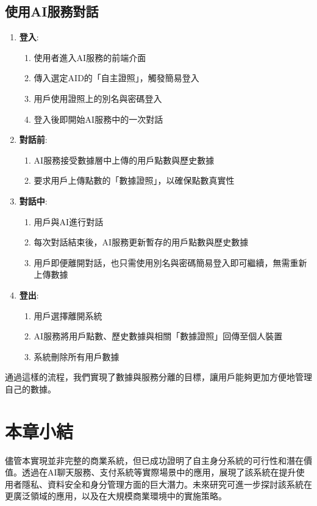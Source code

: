 \subsection{使用AI服務對話}
\begin{enumerate}
  \item \textbf{登入}:
        \begin{enumerate}
          \item 使用者進入AI服務的前端介面
          \item 傳入選定AID的「自主證照」，觸發簡易登入
          \item 用戶使用證照上的別名與密碼登入
          \item 登入後即開始AI服務中的一次對話
        \end{enumerate}
  \item \textbf{對話前}:
        \begin{enumerate}
          \item AI服務接受數據層中上傳的用戶點數與歷史數據
          \item 要求用戶上傳點數的「數據證照」，以確保點數真實性
        \end{enumerate}
  \item \textbf{對話中}:
        \begin{enumerate}
          \item 用戶與AI進行對話
          \item 每次對話結束後，AI服務更新暫存的用戶點數與歷史數據
          \item 用戶即便離開對話，也只需使用別名與密碼簡易登入即可繼續，無需重新上傳數據
        \end{enumerate}
  \item \textbf{登出}:
        \begin{enumerate}
          \item 用戶選擇離開系統
          \item AI服務將用戶點數、歷史數據與相關「數據證照」回傳至個人裝置
          \item 系統刪除所有用戶數據
        \end{enumerate}
\end{enumerate}
通過這樣的流程，我們實現了數據與服務分離的目標，讓用戶能夠更加方便地管理自己的數據。
\section{本章小結}
儘管本實現並非完整的商業系統，但已成功證明了自主身分系統的可行性和潛在價值。透過在AI聊天服務、支付系統等實際場景中的應用，展現了該系統在提升使用者隱私、資料安全和身分管理方面的巨大潛力。未來研究可進一步探討該系統在更廣泛領域的應用，以及在大規模商業環境中的實施策略。